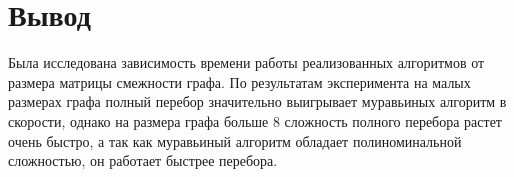  
\section*{Вывод}

Была исследована зависимость времени работы реализованных алгоритмов от размера матрицы смежности графа. По результатам эксперимента на малых размерах графа полный перебор значительно выигрывает муравьиных алгоритм в скорости, однако на размера графа больше 8 сложность полного перебора растет очень быстро, а так как муравьиный алгоритм обладает полиноминальной сложностью, он работает быстрее перебора.

